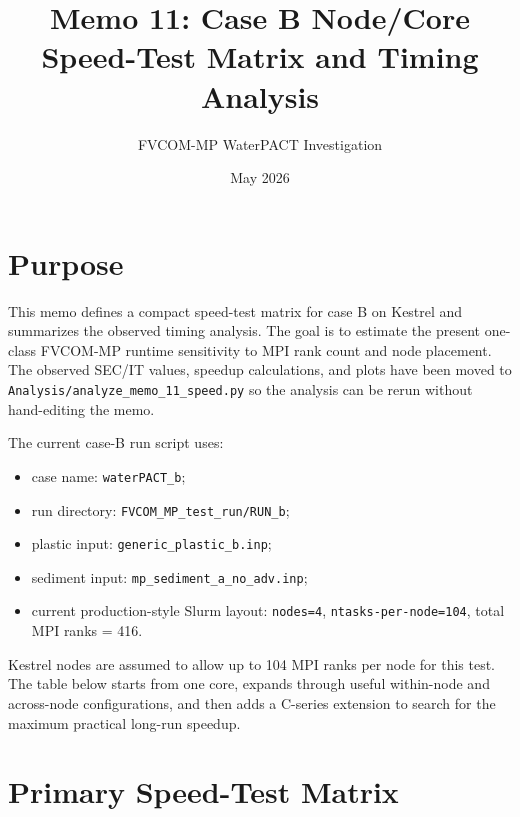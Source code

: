 \documentclass[11pt]{article}
\title{Memo 11: Case B Node/Core Speed-Test Matrix and Timing Analysis}
\author{FVCOM-MP WaterPACT Investigation}
\date{May 2026}
\begin{document}
\sloppy
\setlength{\tabcolsep}{4pt}
\maketitle

\section*{Purpose}

This memo defines a compact speed-test matrix for case B on Kestrel and
summarizes the observed timing analysis.  The goal is to estimate the present
one-class FVCOM-MP runtime sensitivity to MPI rank count and node placement.
The observed SEC/IT values, speedup calculations, and plots have been moved to
\texttt{Analysis/analyze\_memo\_11\_speed.py} so the analysis can be rerun
without hand-editing the memo.

The current case-B run script uses:
\begin{itemize}
  \item case name: \texttt{waterPACT\_b};
  \item run directory: \texttt{FVCOM\_MP\_test\_run/RUN\_b};
  \item plastic input: \texttt{generic\_plastic\_b.inp};
  \item sediment input: \texttt{mp\_sediment\_a\_no\_adv.inp};
  \item current production-style Slurm layout: \texttt{nodes=4},
        \texttt{ntasks-per-node=104}, total MPI ranks = 416.
\end{itemize}

Kestrel nodes are assumed to allow up to 104 MPI ranks per node for this test.
The table below starts from one core, expands through useful within-node and
across-node configurations, and then adds a C-series extension to search for
the maximum practical long-run speedup.

\section*{Primary Speed-Test Matrix}
\end{document}
